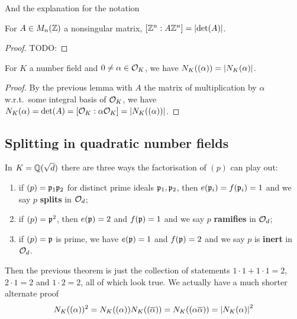 \documentclass{article}
\begin{document}
And the explanation for the notation

\begin{lemma}
    For $A\in M_n(\mathbb{Z})$ a nonsingular matrix, $[\mathbb{Z}^n:A\mathbb{Z}^n]=\left| \det(A) \right|$.\begin{proof}
        TODO:
    \end{proof}
\end{lemma}

\begin{proposition}
    For $K$ a number field and $0\neq\alpha\in\mathcal{O}_K$, we have $N_K((\alpha))=\left| N_K(\alpha) \right|$.
    \begin{proof}
        By the previous lemma with $A$ the matrix of multiplication by $\alpha$ w.r.t.~some integral basis of $\mathcal{O}_K$, we have $N_K(\alpha)=\det(A)=[\mathcal{O}_K:\alpha\mathcal{O}_K]=\left| N_K((\alpha)) \right|$.
    \end{proof}
\end{proposition}

\subsection{Splitting in quadratic number fields}

In $K=\mathbb{Q}(\sqrt{d})$ there are three ways the factorisation of $(p)$ can play out:\begin{enumerate}
    \item if $(p)=\mathfrak{p}_1\mathfrak{p}_2$ for distinct prime ideals $\mathfrak{p}_1,\mathfrak{p}_2$, then $e(\mathfrak{p}_i)=f(\mathfrak{p}_i)=1$ and we say $p$ \textbf{splits} in $\mathcal{O}_d$;
    \item if $(p)=\mathfrak{p}^2$, then $e(\mathfrak{p})=2$ and $f(\mathfrak{p})=1$ and we say $p$ \textbf{ramifies} in $\mathcal{O}_d$;
    \item if $(p)=\mathfrak{p}$ is prime, we have $e(\mathfrak{p})=1$ and $f(\mathfrak{p})=2$ and we say $p$ is \textbf{inert} in $\mathcal{O}_d$.
\end{enumerate}

Then the previous theorem is just the collection of statements $1\cdot 1 + 1\cdot 1 = 2$, $2\cdot 1 = 2$ and $1\cdot 2 = 2$, all of which look true. We actually have a much shorter alternate proof \[
N_K((\alpha))^2 = N_K((\alpha))N_K((\overline{\alpha})) = N_K((\alpha\overline{\alpha})) = \left| N_K(\alpha) \right|^2
\]
\end{document}
